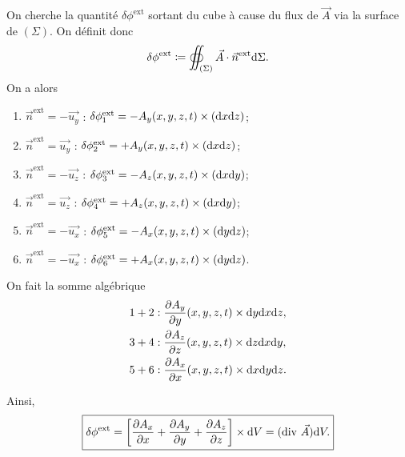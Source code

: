         On cherche la quantité $\delta \phi^{\text{ext}}$ sortant du cube à cause du flux de $\vec{A}$ via la surface de $(\Sigma)$.
        On définit donc 
        \begin{equation*}
            \delta \phi^{\text{ext}}\coloneqq\oiint_{(\Sigma)}\vec{A}\cdot\vec{n}^{\text{ext}}\mathrm{d}\Sigma.
        \end{equation*}
        On a alors
        \begin{enumerate}[label=(\arabic*)]
            \item $\vec{n}^{\text{ext}}=-\vec{u_y}$ : $\delta \phi_{1}^{\text{ext}}=-A_y(x,y,z,t)\times(\mathrm{d} x\mathrm{d} z)$;
            \item $\vec{n}^{\text{ext}}=\vec{u_y}$ : $\delta \phi_{2}^{\text{ext}}=+A_y(x,y,z,t)\times(\mathrm{d} x\mathrm{d} z)$;
            \item $\vec{n}^{\text{ext}}=-\vec{u_z}$ : $\delta \phi_{3}^{\text{ext}}=-A_z(x,y,z,t)\times(\mathrm{d} x\mathrm{d} y)$;
            \item $\vec{n}^{\text{ext}}=\vec{u_z}$ : $\delta \phi_{4}^{\text{ext}}=+A_z(x,y,z,t)\times(\mathrm{d} x\mathrm{d} y)$;
            \item $\vec{n}^{\text{ext}}=-\vec{u_x}$ : $\delta \phi_{5}^{\text{ext}}=-A_x(x,y,z,t)\times(\mathrm{d} y\mathrm{d} z)$;
            \item $\vec{n}^{\text{ext}}=-\vec{u_x}$ : $\delta \phi_{6}^{\text{ext}}=+A_x(x,y,z,t)\times(\mathrm{d} y\mathrm{d} z)$.
        \end{enumerate}

        On fait la somme algébrique
        \begin{equation*}
            \begin{aligned}
                1+2 &: \frac{\partial A_y}{\partial y}(x,y,z,t)\times\mathrm{d} y\mathrm{d} x\mathrm{d} z,\\
                3+4 &: \frac{\partial A_z}{\partial z}(x,y,z,t)\times\mathrm{d} z\mathrm{d} x\mathrm{d} y,\\
                5+6 &: \frac{\partial A_x}{\partial x}(x,y,z,t)\times\mathrm{d} x\mathrm{d} y\mathrm{d} z.
            \end{aligned}
        \end{equation*}

        Ainsi,
        \begin{equation*}
            \boxed{
                \delta \phi^{\text{ext}}=\left[
                    \frac{\partial A_x}{\partial x}+\frac{\partial A_y}{\partial y}+\frac{\partial A_z}{\partial z}
                \right]\times \mathrm{d} V=(\mathrm{div}~\vec{A})\mathrm{d} V.
            }
        \end{equation*}

